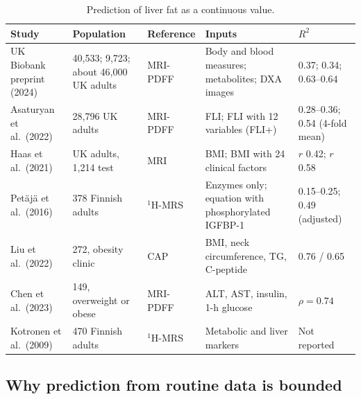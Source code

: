 \begin{table}[t]
\centering
\small
\caption{Prediction of liver fat as a continuous value.}
\label{tab:cont}
\begin{tabularx}{\textwidth}{@{}>{\raggedright\arraybackslash}p{2.5cm} Y >{\raggedright\arraybackslash}p{1.7cm} Y Y@{}}
\toprule
Study & Population & Reference & Inputs & $R^2$ \\
\midrule
UK Biobank preprint (2024) \cite{insitro2024ukb} & 40,533; 9,723; about 46,000 UK adults & MRI-PDFF & Body and blood measures; metabolites; DXA images & 0.37; 0.34; 0.63--0.64 \\
Asaturyan et al.\ (2022) \cite{asaturyan2022fli} & 28,796 UK adults & MRI-PDFF & FLI; FLI with 12 variables (FLI+) & 0.28--0.36; 0.54 (4-fold mean) \\
Haas et al.\ (2021) \cite{haas2021liverfat} & UK adults, 1,214 test & MRI & BMI; BMI with 24 clinical factors & $r$ 0.42; $r$ 0.58 \\
Pet\"aj\"a et al.\ (2016) \cite{petaja2016igfbp} & 378 Finnish adults & $^{1}$H-MRS & Enzymes only; equation with phosphorylated IGFBP-1 & 0.15--0.25; 0.49 (adjusted) \\
Liu et al.\ (2022) \cite{liu2022surrogate} & 272, obesity clinic & CAP & BMI, neck circumference, TG, C-peptide & 0.76 / 0.65 \\
Chen et al.\ (2023) \cite{chen2023shsi} & 149, overweight or obese & MRI-PDFF & ALT, AST, insulin, 1-h glucose & $\rho = 0.74$ \\
Kotronen et al.\ (2009) \cite{kotronen2009prediction} & 470 Finnish adults & $^{1}$H-MRS & Metabolic and liver markers & Not reported \\
\bottomrule
\end{tabularx}
\end{table}

\subsection{Why prediction from routine data is bounded}
\label{sec:lr-bound}

